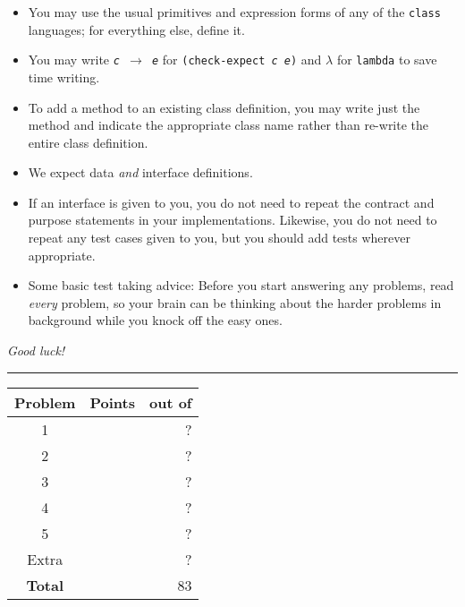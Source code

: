 \documentclass[12pt]{article}                   %
\newcommand\code[1]{\texttt{#1}}
\begin{document}
\noindent\begin{minipage}{8cm}\sloppy
\begin{itemize}
\item You may use the usual primitives and expression forms of any of
  the \code{class} languages; for everything else, define it.

\item You may write {\tt {\slshape c} $\rightarrow$ {\slshape e}} for
  {\tt (check-expect {\slshape c e})} and $\lambda$ for
  \code{lambda} to save time writing.

\item To add a method to an existing class definition, you
  may write just the method and indicate the appropriate class name
  rather than re-write the entire class definition.

\item We expect data \emph{and} interface definitions.

\item If an interface is given to you, you do not need to repeat the
  contract and purpose statements in your implementations.  Likewise,
  you do not need to repeat any test cases given to you, but you
  should add tests wherever appropriate.


\item Some basic test taking advice: Before you start answering
any problems, read \emph{every} problem, so your brain can be thinking
about the harder problems in background while you knock off the easy ones.
\end{itemize}

\bigskip

\emph{Good luck!}
\end{minipage}\hfil\begin{minipage}[t]{6cm}
\rule{1cm}{0pt}\begin{tabular}{|c|l|@{/}r|}
\hline
{\bf Problem} & Points & out of \\ \hline
1 & & ?\\ \hline
2 & & ?\\ \hline
3 & & ?\\ \hline
4 & & ?\\ \hline
5 & & ?\\ \hline
Extra & & ? \\ \hline
{\bf Total} & & 83 \\ \hline
\end{tabular}
\end{minipage}
\end{document}
